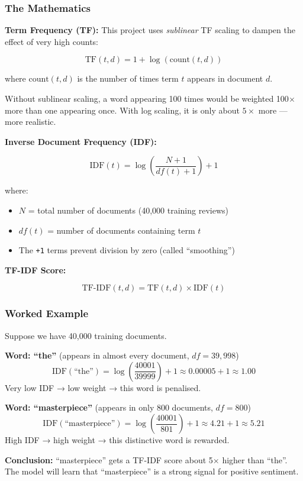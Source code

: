 \documentclass[12pt, a4paper]{article}
\newcommand{\tf}{\mathrm{TF}}
\newcommand{\idf}{\mathrm{IDF}}
\newcommand{\tfidf}{\mathrm{TF\text{-}IDF}}
\begin{document}
\subsubsection{The Mathematics}

\textbf{Term Frequency (TF):}
This project uses \emph{sublinear} TF scaling to dampen the effect of very high counts:

\[
\tf(t, d) = 1 + \log(\text{count}(t, d))
\]

where $\text{count}(t, d)$ is the number of times term $t$ appears in document $d$.

Without sublinear scaling, a word appearing 100 times would be weighted 100$\times$ more than one appearing once. With log scaling, it is only about $5\times$ more — more realistic.

\textbf{Inverse Document Frequency (IDF):}

\[
\idf(t) = \log\left(\frac{N + 1}{df(t) + 1}\right) + 1
\]

where:
\begin{itemize}
  \item $N$ = total number of documents (40{,}000 training reviews)
  \item $df(t)$ = number of documents containing term $t$
  \item The \texttt{+1} terms prevent division by zero (called ``smoothing'')
\end{itemize}

\textbf{TF-IDF Score:}

\[
\tfidf(t, d) = \tf(t, d) \times \idf(t)
\]

\subsubsection{Worked Example}

\begin{tcolorbox}[colback=lightbg, colframe=primary!50, title=\textbf{TF-IDF Example with Real Words}]
Suppose we have 40{,}000 training documents.

\medskip
\textbf{Word: ``the''} (appears in almost every document, $df = 39{,}998$)
\[
\idf(\text{``the''}) = \log\left(\frac{40001}{39999}\right) + 1 \approx 0.00005 + 1 \approx 1.00
\]
Very low IDF → low weight → this word is penalised.

\medskip
\textbf{Word: ``masterpiece''} (appears in only 800 documents, $df = 800$)
\[
\idf(\text{``masterpiece''}) = \log\left(\frac{40001}{801}\right) + 1 \approx 4.21 + 1 \approx 5.21
\]
High IDF → high weight → this distinctive word is rewarded.

\medskip
\textbf{Conclusion:} ``masterpiece'' gets a TF-IDF score about 5$\times$ higher than ``the''. The model will learn that ``masterpiece'' is a strong signal for positive sentiment.
\end{tcolorbox}
\end{document}
